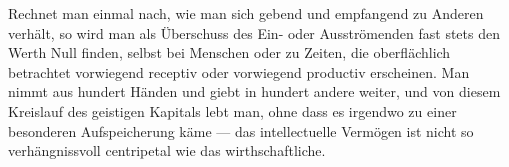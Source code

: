 Rechnet man einmal nach, wie man sich gebend und empfangend zu Anderen verhält, so wird man als Überschuss des Ein- oder Ausströmenden fast stets den Werth Null finden, selbst bei Menschen oder zu Zeiten, die oberflächlich betrachtet vorwiegend receptiv oder vorwiegend productiv erscheinen. Man nimmt aus hundert Händen und giebt in hundert andere weiter, und von diesem Kreislauf des geistigen Kapitals lebt man, ohne dass es irgendwo zu einer besonderen Aufspeicherung käme — das intellectuelle Vermögen ist nicht so verhängnissvoll centripetal wie das wirthschaftliche.
\par

